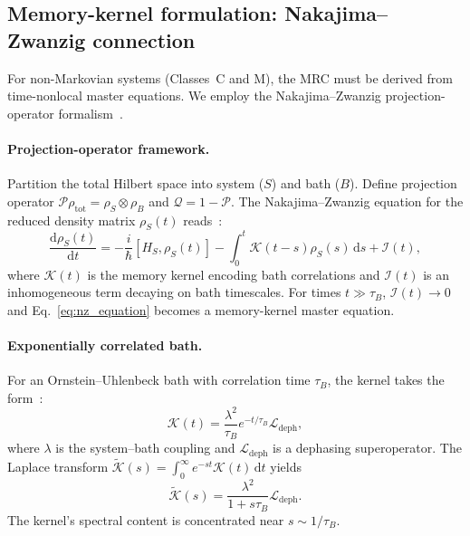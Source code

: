 \documentclass[11pt,letterpaper]{article}
\begin{document}
\subsection{Memory-kernel formulation: Nakajima--Zwanzig connection}
\label{sec:memory_kernel}

For non-Markovian systems (Classes~C and M), the MRC must be derived from time-nonlocal master equations. We employ the Nakajima--Zwanzig projection-operator formalism~\cite{Nakajima1958,Zwanzig1960,Breuer2002}.

\paragraph{Projection-operator framework.} Partition the total Hilbert space into system ($S$) and bath ($B$). Define projection operator $\mathcal{P}\rho_{\text{tot}}=\rho_S\otimes\rho_B$ and $\mathcal{Q}=1-\mathcal{P}$. The Nakajima--Zwanzig equation for the reduced density matrix $\rho_S(t)$ reads~\cite{Breuer2002}:
\begin{equation}
\frac{\mathrm{d}\rho_S(t)}{\mathrm{d}t} = -\frac{i}{\hbar}[H_S,\rho_S(t)] - \int_0^t \mathcal{K}(t-s)\rho_S(s)\,\mathrm{d}s + \mathcal{I}(t),
\label{eq:nz_equation}
\end{equation}
where $\mathcal{K}(t)$ is the memory kernel encoding bath correlations and $\mathcal{I}(t)$ is an inhomogeneous term decaying on bath timescales. For times $t\gg\tau_B$, $\mathcal{I}(t)\to 0$ and Eq.~\eqref{eq:nz_equation} becomes a memory-kernel master equation.

\paragraph{Exponentially correlated bath.} For an Ornstein--Uhlenbeck bath with correlation time $\tau_B$, the kernel takes the form~\cite{Breuer2002}:
\begin{equation}
\mathcal{K}(t) = \frac{\lambda^2}{\tau_B}e^{-t/\tau_B}\mathcal{L}_{\text{deph}},
\end{equation}
where $\lambda$ is the system--bath coupling and $\mathcal{L}_{\text{deph}}$ is a dephasing superoperator. The Laplace transform $\tilde{\mathcal{K}}(s) = \int_0^\infty e^{-st}\mathcal{K}(t)\,\mathrm{d}t$ yields
\begin{equation}
\tilde{\mathcal{K}}(s) = \frac{\lambda^2}{1+s\tau_B}\mathcal{L}_{\text{deph}}.
\label{eq:kernel_laplace}
\end{equation}
The kernel's spectral content is concentrated near $s\sim 1/\tau_B$.
\end{document}
